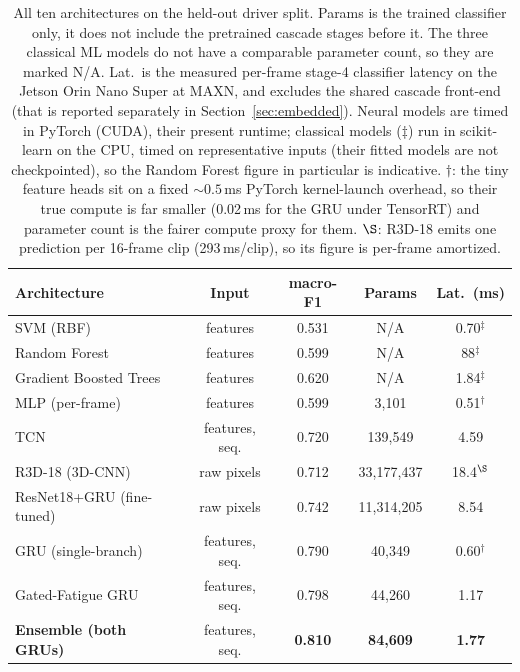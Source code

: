 \documentclass[conference]{IEEEtran}
\begin{document}
\begin{table}[htbp]
\centering
\caption{All ten architectures on the held-out driver split. Params is the trained classifier only, it does not include the pretrained cascade stages before it. The three classical ML models do not have a comparable parameter count, so they are marked N/A. Lat.\ is the measured per-frame stage-4 classifier latency on the Jetson Orin Nano Super at MAXN, and excludes the shared cascade front-end (that is reported separately in Section~\ref{sec:embedded}). Neural models are timed in PyTorch (CUDA), their present runtime; classical models ($\ddagger$) run in scikit-learn on the CPU, timed on representative inputs (their fitted models are not checkpointed), so the Random Forest figure in particular is indicative. $\dagger$: the tiny feature heads sit on a fixed ${\sim}0.5$\,ms PyTorch kernel-launch overhead, so their true compute is far smaller (0.02\,ms for the GRU under TensorRT) and parameter count is the fairer compute proxy for them. $\S$: R3D-18 emits one prediction per 16-frame clip (293\,ms/clip), so its figure is per-frame amortized.}
\label{tab:comparison}
\begin{tabular}{@{}lcccc@{}}
\toprule
\textbf{Architecture} & \textbf{Input} & \textbf{macro-F1} & \textbf{Params} & \textbf{Lat.\ (ms)} \\
\midrule
SVM (RBF) & features & 0.531 & N/A & 0.70$^\ddagger$ \\
Random Forest & features & 0.599 & N/A & 88$^\ddagger$ \\
Gradient Boosted Trees & features & 0.620 & N/A & 1.84$^\ddagger$ \\
MLP (per-frame) & features & 0.599 & 3{,}101 & 0.51$^\dagger$ \\
TCN & features, seq. & 0.720 & 139{,}549 & 4.59 \\
R3D-18 (3D-CNN) & raw pixels & 0.712 & 33{,}177{,}437 & 18.4$^\S$ \\
ResNet18+GRU (fine-tuned) & raw pixels & 0.742 & 11{,}314{,}205 & 8.54 \\
GRU (single-branch) & features, seq. & 0.790 & 40{,}349 & 0.60$^\dagger$ \\
Gated-Fatigue GRU & features, seq. & 0.798 & 44{,}260 & 1.17 \\
\textbf{Ensemble (both GRUs)} & features, seq. & \textbf{0.810} & \textbf{84{,}609} & \textbf{1.77} \\
\bottomrule
\end{tabular}
\end{table}
\end{document}
